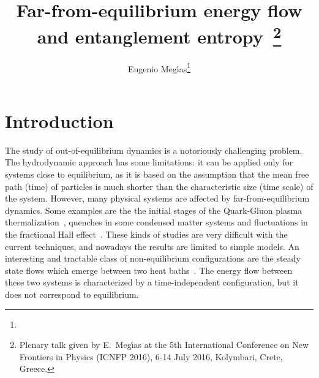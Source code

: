 \documentclass[epj]{webofc}
\begin{document}
%
\title{Far-from-equilibrium energy flow and entanglement entropy~\thanks{Plenary talk given by E.~Meg\'{\i}as at the 5th International Conference on New Frontiers in Physics (ICNFP 2016), 6-14 July 2016, Kolymbari, Crete, Greece.}}
%
%

\author{Eugenio Meg\'{\i}as\fnsep\thanks{}
}


%
\maketitle
%


\section{Introduction}
\label{intro}

The study of out-of-equilibrium dynamics is a notoriously challenging problem. The hydrodynamic approach has some limitations: it can be applied only for systems close to equilibrium, as it is based on the assumption that the mean free path (time) of particles is much shorter than the characteristic size (time scale) of the system. However, many physical systems are affected by far-from-equilibrium dynamics. Some examples are the the initial stages of the Quark-Gluon plasma thermalization~\cite{Ishii:2015gia}, quenches in some condensed matter systems and fluctuations in the fractional Hall effect~\cite{Polkovnikov:2010yn}. These kinds of studies are very difficult with the current techniques, and nowadays the results are limited to simple models. An interesting and tractable class of non-equilibrium configurations are the steady state flows which emerge between two heat baths~\cite{Bernard:2012je,Chang:2013gba,Bhaseen:2013ypa,Amado:2015uza,Megias:2015tva}. The energy flow between these two systems is characterized by a time-independent configuration, but it does not correspond to equilibrium. 
\end{document}
